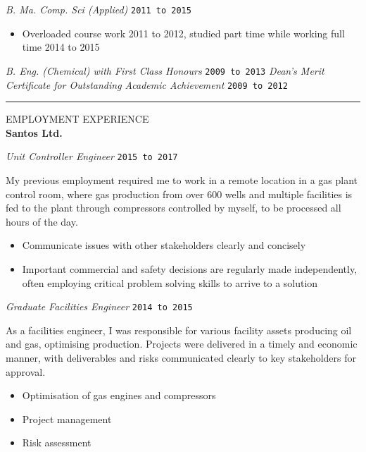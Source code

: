\documentclass{article}
\newcommand{\HRule}{\rule{\linewidth}{0.5mm}}
\begin{document}
\emph{B. Ma. Comp. Sci (Applied)} \hfill  \texttt{2011 to 2015}

{\footnotesize
\begin{itemize}
\item Overloaded course work 2011 to 2012, studied part time while working full time 2014 to 2015
\end{itemize} }

\emph{B. Eng. (Chemical) with First Class Honours} \hfill \texttt{2009 to 2013}
\emph{Dean's Merit Certificate for Outstanding Academic Achievement} \hfill \texttt{2009 to 2012}
\\




\HRule

{\footnotesize EMPLOYMENT EXPERIENCE}
\\

\textbf{\large Santos Ltd.}

\emph{Unit Controller Engineer} \hfill \texttt{2015 to 2017}

{\footnotesize
My previous employment required me to work in a remote location in a gas plant control room, where gas production from over 600 wells and multiple facilities is fed to the plant through compressors controlled by myself, to be processed all hours of the day.

\begin{itemize}
\item Communicate issues with other stakeholders clearly and concisely
\item Important commercial and safety decisions are regularly made independently, often employing critical problem solving skills to arrive to a solution
\end{itemize}
}
\emph{Graduate Facilities Engineer} \hfill \texttt{2014 to 2015}

{\footnotesize
As a facilities engineer, I was responsible for various facility assets producing oil and gas, optimising production. Projects were delivered in a timely and economic manner, with deliverables and risks communicated clearly to key stakeholders for approval.

\begin{itemize}
\item Optimisation of gas engines and compressors
\item Project management
\item Risk assessment \\
\end{itemize} }
\end{document}
